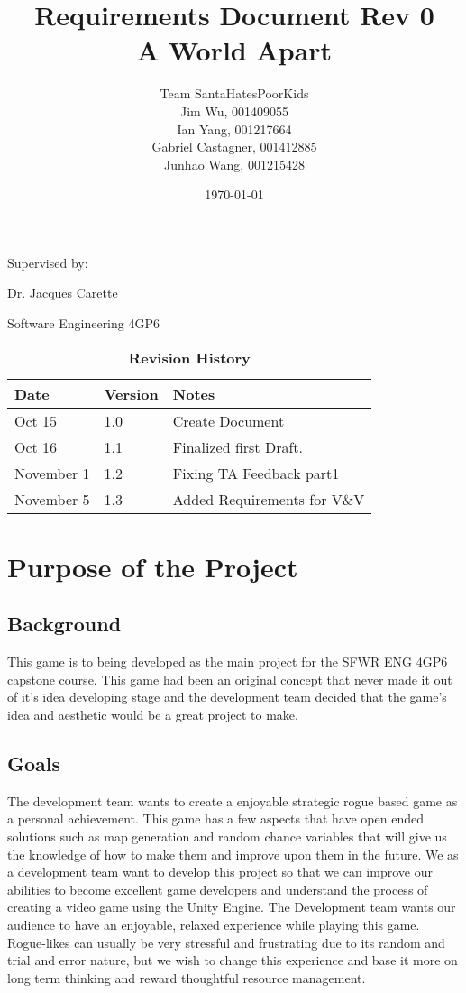 \documentclass{article}
\title{Requirements Document Rev 0\\A World Apart}
\author{Team SantaHatesPoorKids
		\\ Jim Wu, 001409055
		\\ Ian Yang, 001217664
		\\ Gabriel Castagner, 001412885
		\\ Junhao Wang, 001215428
}
\date{\today}
\begin{document}
\begin{titlepage}
\maketitle
\vfill
{\centering
Supervised by:\par 
Dr. Jacques Carette \par
Software Engineering 4GP6 \par
\begin{table}[bp]
\caption{\bf Revision History}
\begin{tabularx}{\textwidth}{p{3cm}p{2cm}X}
\toprule {\bf Date} & {\bf Version} & {\bf Notes}\\
\midrule
Oct 15 & 1.0 & Create Document\\
Oct 16 & 1.1 & Finalized first Draft.\\
November 1 & 1.2 & Fixing TA Feedback part1\\
November 5 & 1.3 &Added Requirements for V\&V\\
\bottomrule
\end{tabularx}
\end{table}
}

\end{titlepage}


\tableofcontents
\newpage


\section{Purpose of the Project}
\subsection{Background}

\quad This game is to being developed as the main project for the SFWR ENG 4GP6 capstone course. This game had been an original concept that never made it out of it's idea developing stage and the development team decided that the game's idea and aesthetic would be a great project to make.
\subsection{Goals}
\quad The development team wants to create a enjoyable strategic rogue based game as a personal achievement. This game has a few aspects that have open ended solutions such as map generation and random chance variables that will give us the knowledge of how to make them and improve upon them in the future. We as a development team want to develop this project so that we can improve our abilities to become excellent game developers and understand the process of creating a video game using the Unity Engine. The Development team wants our audience to have an enjoyable, relaxed experience while playing this game. Rogue-likes can usually be very stressful and frustrating due to its random and trial and error nature, but we wish to change this experience and base it more on long term thinking and reward thoughtful resource management.
\end{document}
